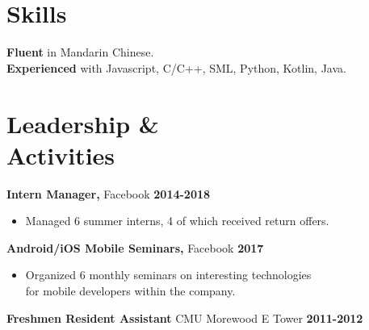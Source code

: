 \documentclass[sectioned]{dsyangres}
\begin{document}
\begin{resume}
\section{Skills}
\textbf{Fluent} in Mandarin Chinese. \\
\textbf{Experienced} with Javascript, C/C++, SML, Python, Kotlin, Java.

\section{Leadership \& \\ Activities}

\textbf{Intern Manager,} Facebook \hfill \textbf{2014-2018}
  \begin{itemize} \itemsep -2pt
    \item Managed 6 summer interns, 4 of which received return offers.
  \end{itemize}
\textbf{Android/iOS Mobile Seminars,} Facebook \hfill \textbf{2017}
  \begin{itemize} \itemsep -2pt
    \item Organized 6 monthly seminars on interesting technologies 
    \\ for mobile developers within the company.
  \end{itemize}


\textbf{Freshmen Resident Assistant} CMU Morewood E Tower \hfill \textbf{2011-2012}


\end{resume}
\end{document}
